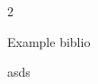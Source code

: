 \documentclass[10pt, twoside]{article}
\begin{document}
    
    
    
    
    \begin{multicols}{2}
        
        Example biblio \cite{HLLD}

        

            asds
    \end{multicols}

   \printbibliography 
\end{document}
